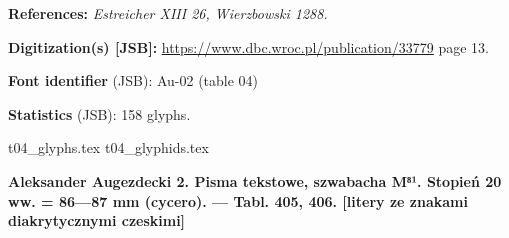 \documentclass[12pt]{article}
\newcommand{\bg}{\begingl}
\newcommand{\pismoPL}[1]{{\relsize{2}\Junicode\textbf{#1}}}
\newcommand{\exampleDig}[1]{{\relsize{0}\Junicode \textbf{Digitization(s) [JSB]:} #1}}
\newcommand{\examplePL}[1]{}
\newcommand{\exampleEN}[1]{}
\newcommand{\fontID}[2]{{\relsize{1}\Junicode\textbf{Font identifier} (JSB): #1 (table #2)}}
\newcommand{\fontstat}[1]{{\relsize{1}\Junicode\textbf{Statistics} (JSB): #1 glyphs.}}
\newcommand{\exampleRef}[1]{{\relsize{0}\Junicode \textbf{References:} #1}}
\begin{document}
\bigskip
\exampleRef{\textit{Estreicher XIII 26, Wierzbowski 1288.}}

\bigskip
\exampleDig{\url{https://www.dbc.wroc.pl/publication/33779} page 13.}


\medskip

    \examplePL{Pismo 2: tekst i zestaw wraz z zestawem liter ze znakami diakrytycznymi polskimi.}

    \medskip

    \exampleEN{Font 2. The text and the table including letters with Polish diacritical marks.}


\bigskip

    \fontID{Au-02}{04}

    \fontstat{158}

\bigskip

 {t04_glyphs.tex}
 {t04_glyphids.tex}


\newpage


\pismoPL{Aleksander Augezdecki 2. Pisma tekstowe, szwabacha
  M⁸¹. Stopień 20 ww. = 86—87 mm (cycero). — Tabl. 405, 406. [litery
  ze znakami diakrytycznymi czeskimi]}
\end{document}
